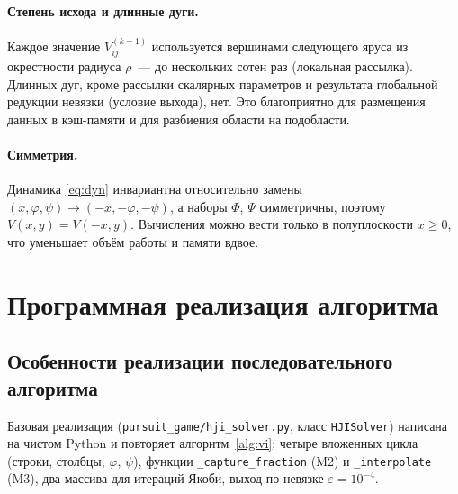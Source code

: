 \documentclass[14pt,a4paper]{extarticle}
\begin{document}
\paragraph{Степень исхода и длинные дуги.}
Каждое значение $V^{(k-1)}_{ij}$ используется вершинами следующего
яруса из окрестности радиуса $\rho$~--- до нескольких сотен раз
(локальная рассылка). Длинных дуг, кроме рассылки скалярных параметров
и результата глобальной редукции невязки (условие выхода), нет. Это
благоприятно для размещения данных в кэш-памяти и для разбиения
области на подобласти.

\paragraph{Симметрия.}
Динамика \eqref{eq:dyn} инвариантна относительно замены
$(x,\varphi,\psi)\to(-x,-\varphi,-\psi)$, а наборы $\Phi$, $\Psi$
симметричны, поэтому $V(x,y)=V(-x,y)$. Вычисления можно вести только в
полуплоскости $x\ge 0$, что уменьшает объём работы и памяти вдвое.

\section{Программная реализация алгоритма}

\subsection{Особенности реализации последовательного алгоритма}

Базовая реализация (\texttt{pursuit\_game/hji\_solver.py},
класс \texttt{HJISolver}) написана на чистом Python и повторяет
алгоритм~\ref{alg:vi}: четыре вложенных цикла (строки, столбцы,
$\varphi$, $\psi$), функции \texttt{\_capture\_fraction} (M2) и
\texttt{\_interpolate} (M3), два массива для итераций Якоби, выход по
невязке $\varepsilon=10^{-4}$.
\end{document}
